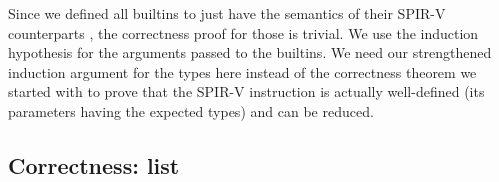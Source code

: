 \documentclass[letterpaper,12pt]{article}
\begin{document}
Since we defined all builtins to just have the semantics of their
SPIR-V counterparts 
, the correctness proof for those is trivial. We use the
induction hypothesis for the arguments passed to the builtins.
We need our strengthened induction argument for the types here
instead of the correctness theorem we started with to prove
that the SPIR-V instruction is actually well-defined (its parameters
having the expected types) and can be reduced.


% 

\subsection{Correctness: list}

% 
\end{document}
